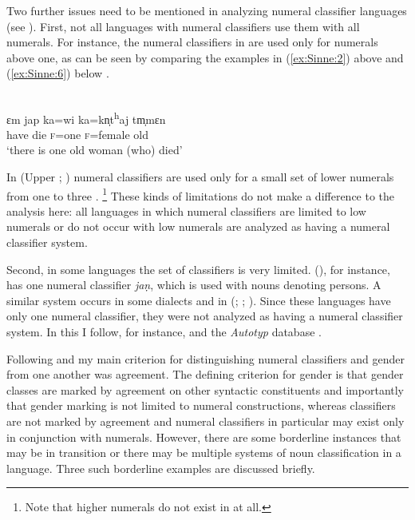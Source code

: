 \documentclass[output=collectionpaper]{langsci/langscibook}
\begin{document}
Two further issues need to be mentioned in analyzing numeral classifier languages (see \citealt{Gil2013}). First, not all languages with numeral classifiers use them with all numerals. For instance, the numeral classifiers in  are used only for numerals above one, as can be seen by comparing the examples in (\ref{ex:Sinne:2}) above and (\ref{ex:Sinne:6}) below \citep[108]{Ring2015}.

\ea\label{ex:Sinne:6}
\\
\gll ɛm jap ka=wi ka=kn̩t\textsuperscript{h}aj tm̩mɛn\\
have die \textsc{f=}one \textsc{f}=female old\\
\glt `there is one old woman (who) died'
\z

In  (Upper ; ) numeral classifiers are used only for a small set of lower numerals from one to three \citep[56--57]{Lock2011}.%
\footnote{Note that higher numerals do not exist in  at all.} %
These kinds of limitations do not make a difference to the analysis here: all languages in which numeral classifiers are limited to low numerals or do not occur with low numerals are analyzed as having a numeral classifier system.

Second, in some languages the set of classifiers is very limited.  (), for instance, has one numeral classifier \textit{jaṇ}, which is used with nouns denoting persons. A similar system occurs in some  dialects and in  (; ; \citealt[11--12]{Emeneau1956}). Since these languages have only one numeral classifier, they were not analyzed as having a numeral classifier system. In this I follow, for instance, \citet{Nichols1992} and the \textit{Autotyp} database \citep{Bickel2017}.

Following \citet[129, 132]{Nichols1992} and \citet[4--5]{Corbett1991} my main criterion for distinguishing numeral classifiers and gender from one another was agreement. The defining criterion for gender is that gender classes are marked by agreement on other syntactic constituents \textendash{} and importantly that gender marking is not limited to numeral constructions, whereas classifiers are not marked by agreement and numeral classifiers in particular may exist only in conjunction with numerals. However, there are some borderline instances that may be in transition or there may be multiple systems of noun classification in a language. Three such borderline examples are discussed briefly.
\end{document}
